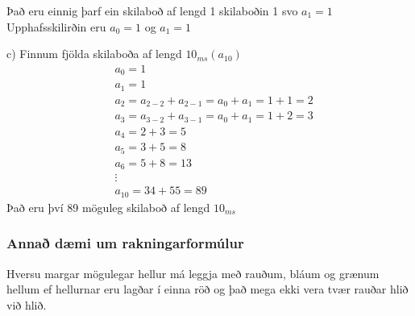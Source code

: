 Það eru einnig þarf ein skilaboð af lengd 1 skilaboðin 1 svo $a_1 = 1$\\
\hspace*{1.3em}Upphafsskilirðin eru $a_0=1$ og $a_1=1$\vspace*{0.5em}

c) Finnum fjölda skilaboða af lengd $10_{ms}(a_{10})$
\begin{align*}
    &a_0 = 1\\
    &a_1 = 1\\
    &a_2 = a_{2-2}+ a_{2-1} = a_0 + a_1 = 1 + 1 = 2\\
    &a_3 = a_{3-2}+ a_{3-1} = a_0 + a_1 = 1 + 2 = 3 \\
    &a_4 = 2 + 3 = 5\\
    &a_5 = 3 + 5 = 8\\
    &a_6 = 5 + 8 = 13\\
    &\vdots\\
    &a_{10} = 34 + 55 = 89
\end{align*}
Það eru því 89 möguleg skilaboð af lengd $10_{ms}$

\newpage
\subsubsection{Annað dæmi um rakningarformúlur}
Hversu margar mögulegar hellur má leggja með rauðum, bláum og grænum hellum ef hellurnar eru lagðar í einna röð og það mega ekki vera tvær rauðar hlið við hlið.\vspace*{1em}

